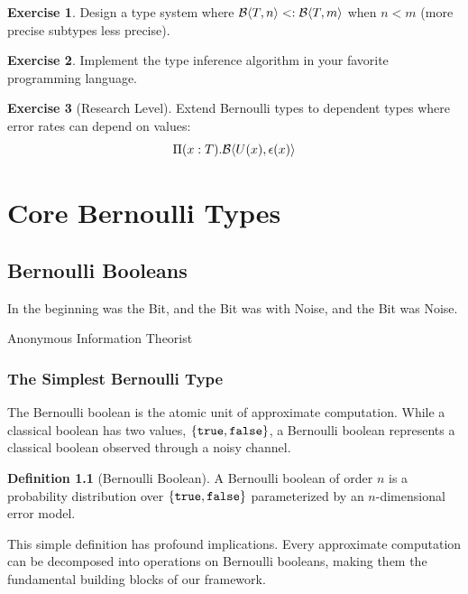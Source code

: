 \documentclass[11pt,twoside,openright]{book}
\theoremstyle{definition}
\newtheorem{definition}{Definition}[chapter]
\newtheorem{exercise}[definition]{Exercise}
\theoremstyle{plain}
\theoremstyle{remark}
\begin{document}
\begin{exercise}
Design a type system where $\mathcal{B}\langle T, n \rangle <: \mathcal{B}\langle T, m \rangle$ when $n < m$ (more precise subtypes less precise).
\end{exercise}

\begin{exercise}
Implement the type inference algorithm in your favorite programming language.
\end{exercise}

\begin{exercise}[Research Level]
Extend Bernoulli types to dependent types where error rates can depend on values:
\begin{equation}
\Pi (x : T). \mathcal{B}\langle U(x), \epsilon(x) \rangle
\end{equation}
\end{exercise}

\part{Core Bernoulli Types}

\chapter{Bernoulli Booleans}
\label{ch:bernoulli-bool}

\epigraph{In the beginning was the Bit, and the Bit was with Noise, and the Bit was Noise.}{Anonymous Information Theorist}

\section{The Simplest Bernoulli Type}

The Bernoulli boolean is the atomic unit of approximate computation. While a classical boolean has two values, $\{\mathtt{true}, \mathtt{false}\}$, a Bernoulli boolean represents a classical boolean observed through a noisy channel.

\begin{definition}[Bernoulli Boolean]
A Bernoulli boolean of order $n$ is a probability distribution over $\{\mathtt{true}, \mathtt{false}\}$ parameterized by an $n$-dimensional error model.
\end{definition}

This simple definition has profound implications. Every approximate computation can be decomposed into operations on Bernoulli booleans, making them the fundamental building blocks of our framework.
\end{document}
